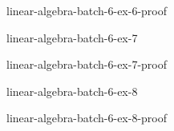 \documentclass[preview]{standalone}
\begin{document}
\begin{snippetsolution}{linear-algebra-batch-6-ex-6-proof}{}
    \todo
\end{snippetsolution}

\begin{snippetexercise}{linear-algebra-batch-6-ex-7}{}
    \todo
\end{snippetexercise}

\begin{snippetsolution}{linear-algebra-batch-6-ex-7-proof}{}
    \todo
\end{snippetsolution}

\begin{snippetexercise}{linear-algebra-batch-6-ex-8}{}
    \todo
\end{snippetexercise}

\begin{snippetsolution}{linear-algebra-batch-6-ex-8-proof}{}
    \todo
\end{snippetsolution}
\end{document}
